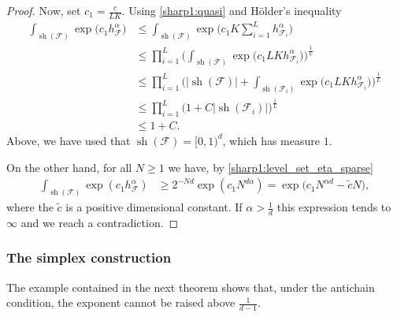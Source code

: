 \documentclass[oneside]{amsart}
\theoremstyle{definition}
\theoremstyle{plain}
\numberwithin{equation}{section}
\numberwithin{theorem}{section}
\newcommand{\sh}{\operatorname{sh}}
\begin{document}
\begin{proof}
  Now, set $c_1 = \frac{c}{LK}$.
  Using \eqref{sharp1:quasi} and Hölder's inequality
  \begin{align*}
    \int_{\sh(\mathcal{F})} \exp\big( c_1 h_{\mathcal{F}}^\alpha \big)
    &\leq \int_{\sh(\mathcal{F})} \exp\Bigg(
      c_1 K \sum_{i=1}^L h_{\mathcal{F}_i}^\alpha
    \Bigg) \\
    &\leq \prod_{i=1}^L \Bigg(
      \int_{\sh(\mathcal{F})} \exp\big(c_1 LK h_{\mathcal{F}_i}^\alpha \big)
    \Bigg)^{\frac{1}{L}} \\
    &\leq \prod_{i=1}^L \Bigg( |\sh(\mathcal{F})| +
      \int_{\sh(\mathcal{F}_i)} \exp\big(c_1 LK h_{\mathcal{F}_i}^\alpha \big)
    \Bigg)^{\frac{1}{L}} \\
    &\leq \prod_{i=1}^L \big( 1 + C |\sh(\mathcal{F}_i)| \big)^{\frac{1}{L}}
    \\
    &\leq 1+C.
  \end{align*}
  Above, we have used that $\sh(\mathcal{F}) = [0,1)^d$, which has measure $1$.

  On the other hand, for all $N \geq 1$ we have, by
  \eqref{sharp1:level_set_eta_sparse}
  \begin{align*}
    \int_{\sh(\mathcal{F})} \exp(c_1 h_{\mathcal{F}}^{\alpha})
    &\geq 2^{-Nd} \exp(c_1 N^{d\alpha})
    = \exp\Big( c_1 N^{\alpha d} -\widetilde{c} N \Big),
  \end{align*}
  where the $\widetilde{c}$ is a positive dimensional constant.
  If $\alpha > \frac{1}{d}$ this expression tends to $\infty$ and we reach a
  contradiction.
\end{proof}

\subsubsection{The simplex construction}

The example contained in the next theorem shows that, under the antichain
condition, the exponent cannot be raised above $\frac{1}{d-1}$.
\end{document}
